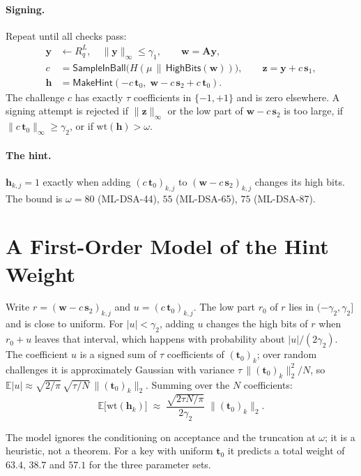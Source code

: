 \documentclass{article}
\newcommand{\hint}{\mathbf{h}}
\newcommand{\sz}{\mathbf{s}_2}
\newcommand{\sone}{\mathbf{s}_1}
\newcommand{\tzero}{\mathbf{t}_0}
\newcommand{\boldA}{\mathbf{A}}
\newcommand{\boldw}{\mathbf{w}}
\newcommand{\boldz}{\mathbf{z}}
\newcommand{\boldy}{\mathbf{y}}
\newcommand{\wt}[1]{\mathrm{wt}(#1)}
\newcommand{\MakeHint}{\mathsf{MakeHint}}
\newcommand{\HighBits}{\mathsf{HighBits}}
\begin{document}
\paragraph{Signing.}
Repeat until all checks pass:
\begin{align*}
  \boldy &\leftarrow R_q^L,\quad \|\boldy\|_\infty \le \gamma_1, \qquad
  \boldw = \boldA \boldy,\\
  c &= \mathsf{SampleInBall}\big(H(\mu \,\|\, \HighBits(\boldw))\big), \qquad
  \boldz = \boldy + c\,\sone,\\
  \hint &= \MakeHint(-c\,\tzero,\; \boldw - c\,\sz + c\,\tzero).
\end{align*}
The challenge $c$ has exactly $\tau$ coefficients in $\{-1,+1\}$ and is zero
elsewhere.  A signing attempt is rejected if $\|\boldz\|_\infty$ or the low
part of $\boldw - c\,\sz$ is too large, if $\|c\,\tzero\|_\infty \ge \gamma_2$,
or if $\wt{\hint} > \omega$.

\paragraph{The hint.}
$\hint_{k,j} = 1$ exactly when adding $(c\,\tzero)_{k,j}$ to
$(\boldw - c\,\sz)_{k,j}$ changes its high bits.  The bound is
$\omega = 80$ (ML-DSA-44), $55$ (ML-DSA-65), $75$ (ML-DSA-87).

\section{A First-Order Model of the Hint Weight}
\label{sec:model}

Write $r = (\boldw - c\,\sz)_{k,j}$ and $u = (c\,\tzero)_{k,j}$.  The low part
$r_0$ of $r$ lies in $(-\gamma_2, \gamma_2]$ and is close to uniform.  For
$|u| < \gamma_2$, adding $u$ changes the high bits of $r$ when $r_0 + u$ leaves
that interval, which happens with probability about $|u| / (2\gamma_2)$.
The coefficient $u$ is a signed sum of $\tau$ coefficients of $(\tzero)_k$; over
random challenges it is approximately Gaussian with variance
$\tau\,\|(\tzero)_k\|_2^2 / N$, so
$\mathbb{E}|u| \approx \sqrt{2/\pi}\,\sqrt{\tau/N}\,\|(\tzero)_k\|_2$.
Summing over the $N$ coefficients:
\begin{equation}
\label{eq:model}
  \mathbb{E}\big[\wt{\hint_k}\big] \;\approx\;
  \frac{\sqrt{2\tau N/\pi}}{2\gamma_2}\;\|(\tzero)_k\|_2 .
\end{equation}

The model ignores the conditioning on acceptance and the truncation at
$\omega$; it is a heuristic, not a theorem.  For a key with uniform $\tzero$
it predicts a total weight of $63.4$, $38.7$ and $57.1$ for the three
parameter sets.
\end{document}
